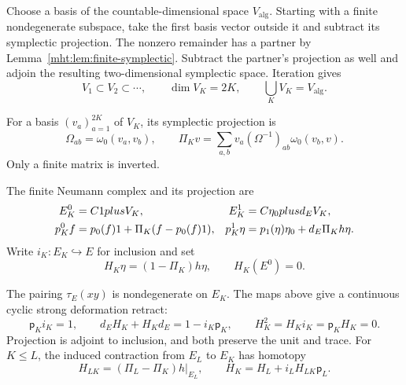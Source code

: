 Choose a basis of the countable-dimensional space $V_{\mathrm{alg}}$.
Starting with a finite nondegenerate subspace, take the first basis
vector outside it and subtract its symplectic projection. The nonzero
remainder has a partner by Lemma~\ref{mht:lem:finite-symplectic}.
Subtract the partner's projection as well and adjoin the resulting
two-dimensional symplectic space. Iteration gives
\[
 V_1\subset V_2\subset\cdots,
 \qquad \dim V_K=2K,
 \qquad \bigcup_KV_K=V_{\mathrm{alg}}.
\]

For a basis $(v_a)_{a=1}^{2K}$ of $V_K$, its symplectic projection is
\begin{equation}\label{mht:eq:finite-symplectic-projection}
 \Omega_{ab}=\omega_0(v_a,v_b),\qquad
 \Pi_Kv=\sum_{a,b}v_a(\Omega^{-1})_{ab}\omega_0(v_b,v).
\end{equation}
Only a finite matrix is inverted.

\begin{definition}\label{mht:def:finite-neumann-complex}
The finite Neumann complex and its projection are
\begin{align}
 E_K^0&=\mathbb C1\oplus V_K,&
 E_K^1&=\mathbb C\eta_0\oplus d_EV_K,\notag\\
 \mathsf p_K^0f&=p_0(f)1+\Pi_K(f-p_0(f)1),&
 \mathsf p_K^1\eta&=p_1(\eta)\eta_0+d_E\Pi_Kh\eta.
 \label{mht:eq:finite-neumann-projection}
\end{align}
Write $i_K:E_K\hookrightarrow E$ for inclusion and set
\[
 H_K\eta=(1-\Pi_K)h\eta,\qquad H_K(E^0)=0.
\]
\end{definition}

\begin{theorem}\label{mht:thm:finite-cyclic-contraction}
The pairing $\tau_E(xy)$ is nondegenerate on $E_K$. The maps above
give a continuous cyclic strong deformation retract:
\[
 \mathsf p_Ki_K=1,\qquad d_EH_K+H_Kd_E=1-i_K\mathsf p_K,
 \qquad H_K^2=H_Ki_K=\mathsf p_KH_K=0.
\]
Projection is adjoint to inclusion, and both preserve the unit and
trace. For $K\leq L$, the induced contraction from $E_L$ to $E_K$
has homotopy
\begin{equation}\label{mht:eq:finite-nested-homotopy}
 H_{LK}=(\Pi_L-\Pi_K)h|_{E_L},\qquad
 H_K=H_L+i_LH_{LK}\mathsf p_L.
\end{equation}
\end{theorem}

